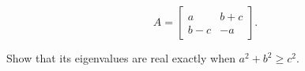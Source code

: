 \[A=\begin{bmatrix}a&b+c\\ b-c&-a\end{bmatrix}.\]

Show that its eigenvalues are real exactly when \(a^{2}+b^{2}\geq c^{2}\).

